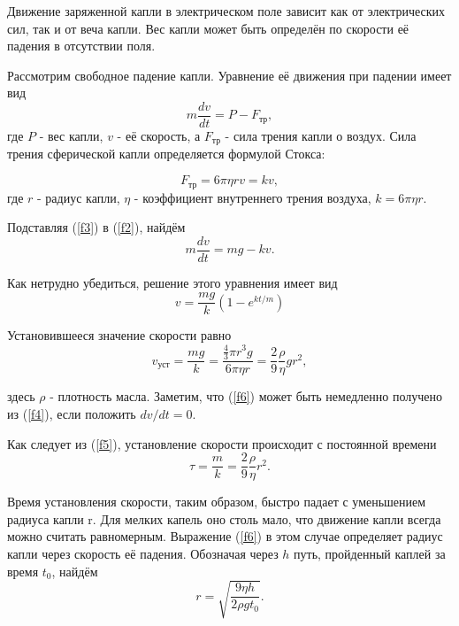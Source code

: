 \documentclass[a4paper, 12pt, twoside]{article}
\begin{document}
Движение заряженной капли в электрическом поле зависит как от электрических сил, так и от веча капли. Вес капли может быть определён по скорости её падения в отсутствии поля.

Рассмотрим свободное падение капли. Уравнение её движения при падении имеет вид 
\begin{equation}
\label{f2}
m\dfrac{dv}{dt} = P - F_{\text{тр}},
\end{equation}
где $P$ - вес капли, $v$ - её скорость, а $F_{\text{тр}}$ - сила трения капли о воздух. Сила трения сферической капли определяется формулой Стокса:

\begin{equation}
\label{f3}
F_{\text{тр}} = 6\pi \eta rv = kv,
\end{equation}
где $r$ - радиус капли, $\eta$ - коэффициент внутреннего трения воздуха, $k = 6\pi \eta r$.

Подставляя (\ref{f3}) в (\ref{f2}), найдём
\begin{equation}
\label{f4}
m\dfrac{dv}{dt} = mg - kv.
\end{equation}

Как нетрудно убедиться, решение этого уравнения имеет вид
\begin{equation}
\label{f5}
v = \dfrac{mg}{k}\left(1 - e^{kt/m} \right )
\end{equation}

Установившееся значение скорости равно
\begin{equation}
\label{f6}
v_{\text{уст}} = \dfrac{mg}{k} = \dfrac{\frac{4}{3}\pi r^{3}g}{6\pi \eta r} = \dfrac{2}{9} \dfrac{\rho}{\eta}gr^{2},
\end{equation}

здесь $\rho$ - плотность масла. Заметим, что (\ref{f6}) может быть немедленно получено из (\ref{f4}), если положить $dv/dt = 0$.

Как следует из (\ref{f5}), установление скорости происходит с постоянной времени 
\begin{equation}
\label{f7}
\tau = \dfrac{m}{k} = \dfrac{2}{9} \dfrac{\rho}{\eta}r^{2}.
\end{equation}

Время установления скорости, таким образом, быстро падает с уменьшением радиуса капли r. Для мелких капель оно столь мало, что движение капли всегда можно считать равномерным. Выражение (\ref{f6}) в этом случае определяет радиус капли через скорость её падения. Обозначая через $h$ путь, пройденный каплей за время $t_0$, найдём
\begin{equation}
\label{f8}
r = \sqrt{\dfrac{9\eta h}{2\rho g t_{0}}}.
\end{equation}
\end{document}
